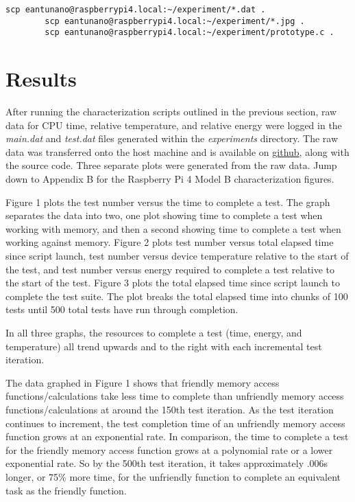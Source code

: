 \documentclass[journal]{IEEEtran}
\begin{document}
    \begin{lstlisting}[frame=single]
        scp eantunano@raspberrypi4.local:~/experiment/*.dat .
        scp eantunano@raspberrypi4.local:~/experiment/*.jpg .
        scp eantunano@raspberrypi4.local:~/experiment/prototype.c .
    \end{lstlisting}

    \section{Results}
    After running the characterization scripts outlined in the previous section, raw data for CPU time, relative temperature, and relative energy were logged in the \emph{main.dat} and \emph{test.dat} files generated within the \emph{experiments} directory.
    The raw data was transferred onto the host machine and is available on {\href{https://github.com/enriquea02/uw/tree/d529ec8c53c7cc006b5184ab091cdea1d053dabc/eep522a_embedded_and_real-time_systems/submissions/a1_configuration}{github}}, along with the source code.
    Three separate plots were generated from the raw data. Jump down to Appendix B for the Raspberry Pi 4 Model B characterization figures.
    
    Figure 1 plots the test number versus the time to complete a test. The graph separates the data into two, one plot showing time to complete a test when working with memory, and then a second showing time to complete a test when working against memory.
    Figure 2 plots test number versus total elapsed time since script launch, test number versus device temperature relative to the start of the test, and test number versus energy required to complete a test relative to the start of the test. 
    Figure 3 plots the total elapsed time since script launch to complete the test suite. The plot breaks the total elapsed time into chunks of 100 tests until 500 total tests have run through completion.

    In all three graphs, the resources to complete a test (time, energy, and temperature) all trend upwards and to the right with each incremental test iteration.

    The data graphed in Figure 1 shows that friendly memory access functions/calculations take less time to complete than unfriendly memory access functions/calculations at around the 150th test iteration.
    As the test iteration continues to increment, the test completion time of an unfriendly memory access function grows at an exponential rate. 
    In comparison, the time to complete a test for the friendly memory access function grows at a polynomial rate or a lower exponential rate.
    So by the 500th test iteration, it takes approximately .006s longer, or 75\% more time, for the unfriendly function to complete an equivalent task as the friendly function.
\end{document}
